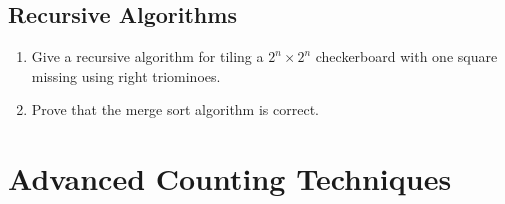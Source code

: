 \documentclass{../../cls/sig-alternate-05-2015}
\begin{document}
\begin{enumerate}
\end{enumerate}

\subsection{Recursive Algorithms}
\begin{enumerate}
\item Give a recursive algorithm for tiling a $2^n \times 2^n$ checkerboard with one square missing using right triominoes.

\item Prove that the merge sort algorithm is correct.
\end{enumerate}

\section{Advanced Counting Techniques}
\end{document}
